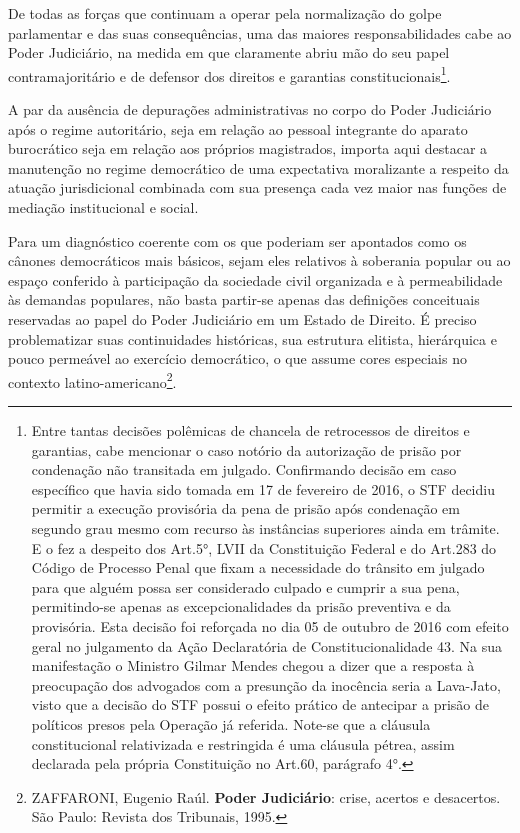 De todas as forças que continuam a operar pela normalização do golpe
parlamentar e das suas consequências, uma das maiores responsabilidades
cabe ao Poder Judiciário, na medida em que claramente abriu mão do seu
papel contramajoritário e de defensor dos direitos e garantias
constitucionais\footnote{Entre tantas decisões polêmicas de chancela de
  retrocessos de direitos e garantias, cabe mencionar o caso notório da
  autorização de prisão por condenação não transitada em julgado.
  Confirmando decisão em caso específico que havia sido tomada em 17 de
  fevereiro de 2016, o STF decidiu permitir a execução provisória da
  pena de prisão após condenação em segundo grau mesmo com recurso às
  instâncias superiores ainda em trâmite. E o fez a despeito dos Art.5°,
  LVII da Constituição Federal e do Art.283 do Código de Processo Penal
  que fixam a necessidade do trânsito em julgado para que alguém possa
  ser considerado culpado e cumprir a sua pena, permitindo-se apenas as
  excepcionalidades da prisão preventiva e da provisória. Esta decisão
  foi reforçada no dia 05 de outubro de 2016 com efeito geral no
  julgamento da Ação Declaratória de Constitucionalidade 43. Na sua
  manifestação o Ministro Gilmar Mendes chegou a dizer que a resposta à
  preocupação dos advogados com a presunção da inocência seria a
  Lava-Jato, visto que a decisão do STF possui o efeito prático de
  antecipar a prisão de políticos presos pela Operação já referida.
  Note-se que a cláusula constitucional relativizada e restringida é uma
  cláusula pétrea, assim declarada pela própria Constituição no Art.60,
  parágrafo 4°.}.

A par da ausência de depurações administrativas no corpo do Poder
Judiciário após o regime autoritário, seja em relação ao pessoal
integrante do aparato burocrático seja em relação aos próprios
magistrados, importa aqui destacar a manutenção no regime democrático de
uma expectativa moralizante a respeito da atuação jurisdicional
combinada com sua presença cada vez maior nas funções de mediação
institucional e social.

Para um diagnóstico coerente com os que poderiam ser apontados como os
cânones democráticos mais básicos, sejam eles relativos à soberania
popular ou ao espaço conferido à participação da sociedade civil
organizada e à permeabilidade às demandas populares, não basta partir-se
apenas das definições conceituais reservadas ao papel do Poder
Judiciário em um Estado de Direito. É preciso problematizar suas
continuidades históricas, sua estrutura elitista, hierárquica e pouco
permeável ao exercício democrático, o que assume cores especiais no
contexto latino-americano\footnote{ZAFFARONI, Eugenio Raúl.
  \textbf{Poder Judiciário}: crise, acertos e desacertos. São Paulo:
  Revista dos Tribunais, 1995.}.

